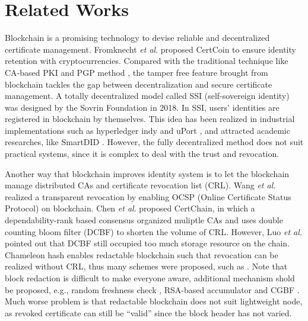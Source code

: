 \documentclass[conference]{IEEEtran}
\begin{document}
\section{Related Works}\label{section:related}
Blockchain is a promising technology to devise reliable and decentralized certificate management. Fromknecht \textit{et al}. 
\cite{fromknechtDecentralizedPublicKey} proposed CertCoin to ensure identity retention with cryptocurrencies.  
Compared with the traditional technique like CA-based PKI \cite{pki} and PGP method \cite{pgp}, the tamper free feature brought from blockchain tackles the gap between decentralization and secure certificate management. 
A totally decentralized model called SSI (self-sovereign identity) \cite{foundation_sovrin_2018} was designed by the Sovrin Foundation in 2018. In SSI, users' identities are registered in blockchain by themselves. 
This idea has been realized in industrial implementations such as hyperledger indy \cite{indy} and uPort \cite{naik2020uport}, and attracted academic researches, like SmartDID \cite{smartdid}. However, the fully decentralized method does not suit practical systems, since it is complex to deal with the trust and revocation.

Another way that blockchain improves identity system is to let the blockchain manage distributed CAs and certificate revocation list (CRL). Wang \textit{et al.} \cite{CTRT} realized a transparent revocation by enabling OCSP (Online Certificate Status Protocol) on blockchain.
Chen \textit{et al}. \cite{chenCertchainPublicEfficient2018a} proposed CertChain, in which a dependability-rank based consensus organized muliptle CAs and uses double counting bloom filter (DCBF) to shorten the volume of CRL. However, Luo \textit{et al.} \cite{luoScalaCertScalabilityOrientedPKI2022a} pointed out that DCBF still occupied too much storage resource on the chain. Chameleon hash \cite{ateniese2017redactable} enables redactable blockchain such that revocation can be realized without CRL, thus many schemes were proposed, such as \cite{luoScalaCertScalabilityOrientedPKI2022a,jiaRedactableBlockchainDecentralized2022, xu2021k, jia2021process}. Note that block redaction is difficult to make everyone aware, additional mechanism shold be proposed, e.g., random freshness check \cite{luoScalaCertScalabilityOrientedPKI2022a}, RSA-based accumulator \cite{jiaRedactableBlockchainDecentralized2022} and CGBF \cite{jia2021process}. Much worse problem is that redactable blockchain does not suit lightweight node, as revoked certificate can still be ``valid'' since the block header has not varied.
\end{document}
